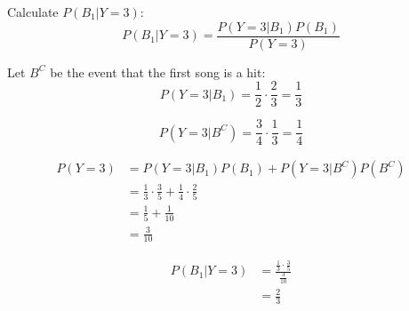 Calculate $P(B_1|Y=3)$:
\[
	P(B_1|Y=3) = \frac{P(Y=3|B_1)P(B_1)}{P(Y=3)}
\]

Let $B^C$ be the event that the first song is a hit:
\[
	P(Y=3|B_1) = \frac{1}{2}\cdot\frac{2}{3} = \frac{1}{3}
\]

\[
	P(Y=3|B^C) = \frac{3}{4}\cdot \frac{1}{3} = \frac{1}{4}
\]

\begin{align*}
	P(Y=3) & = P(Y=3|B_1)P(B_1) + P(Y=3|B^C)P(B^C)                           \\
	       & = \frac{1}{3} \cdot \frac{3}{5} + \frac{1}{4} \cdot \frac{2}{5} \\
	       & = \frac{1}{5} + \frac{1}{10}                                    \\
	       & = \frac{3}{10}
\end{align*}

\begin{align*}
	P(B_1|Y=3) & = \frac{\frac{1}{3} \cdot \frac{3}{5}}{\frac{3}{10}} \\
	           & = \frac{2}{3}
\end{align*}

